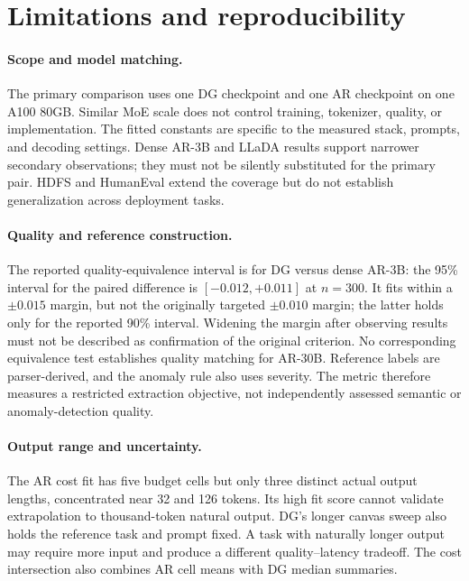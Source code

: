 \section{Limitations and reproducibility}
\label{sec:threats}

\paragraph{Scope and model matching.}
The primary comparison uses one DG checkpoint and one AR checkpoint on
one A100 80GB. Similar MoE scale does not control training, tokenizer,
quality, or implementation. The fitted constants are specific to the
measured stack, prompts, and decoding settings. Dense AR-3B and
LLaDA results support narrower secondary observations; they must not be
silently substituted for the primary pair. HDFS and HumanEval extend
the coverage but do not establish generalization across deployment tasks.

\paragraph{Quality and reference construction.}
The reported quality-equivalence interval is for DG versus dense AR-3B:
the 95\% interval for the paired difference is $[-0.012,+0.011]$
at $n{=}300$. It fits within a $\pm0.015$ margin, but not the
originally targeted $\pm0.010$ margin; the latter holds only for the
reported 90\% interval. Widening the margin after observing results
must not be described as confirmation of the original criterion.
No corresponding equivalence test establishes quality matching for
AR-30B. Reference labels are parser-derived, and the anomaly rule also
uses severity. The metric therefore measures a restricted extraction
objective, not independently assessed semantic or anomaly-detection quality.

\paragraph{Output range and uncertainty.}
The AR cost fit has five budget cells but only three distinct actual
output lengths, concentrated near 32 and 126 tokens. Its high fit score
cannot validate extrapolation to thousand-token natural output.
DG's longer canvas sweep also holds the reference task and prompt fixed.
A task with naturally longer output may require more input and produce
a different quality--latency tradeoff. The cost intersection also combines
AR cell means with DG median summaries.

